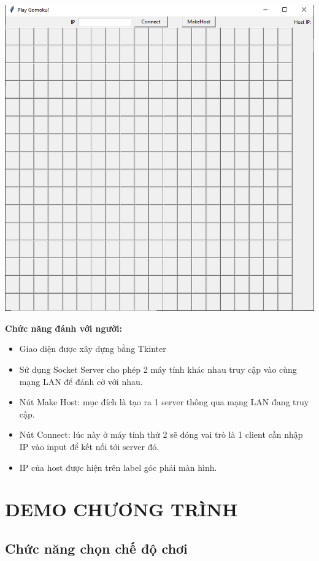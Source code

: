 \documentclass[a4paper]{article}
\begin{document}
\begin{center}
\includegraphics[width=1\textwidth]{images/gomoku_human.png} \\
\end{center}
\textbf{Chức năng đánh với người:}
\begin{itemize}
    \item Giao diện được xây dựng bằng Tkinter
    \item Sử dụng Socket Server cho phép 2 máy tính khác nhau truy cập vào cùng mạng LAN để đánh cờ với nhau.
    \item Nút Make Host: mục đích là tạo ra 1 server thông qua mạng LAN đang truy cập.
    \item Nút Connect: lúc này ở máy tính thứ 2 sẽ đóng vai trò là 1 client cần nhập IP vào input để kết nối tới server đó.
    \item IP của host được hiện trên label góc phải màn hình.
\end{itemize}
\newpage

\section{DEMO CHƯƠNG TRÌNH}

\subsection{Chức năng chọn chế độ chơi}
\end{document}
